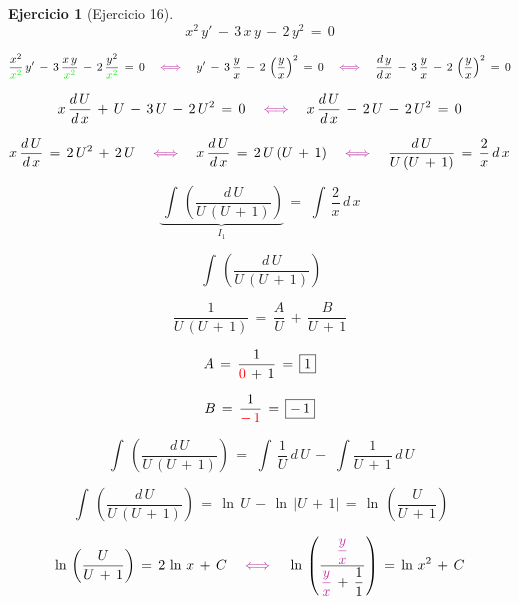 \documentclass[a4paper,11pt,openany]{book}
\newtheorem{ejer}{Ejercicio}[section]
\begin{document}
\begin{ejer}[Ejercicio 16] 

  $$x^{2}\,y'\,-\,3\,x\,y\,-\,2\,y^{2}\,=\,0$$ 


 $$\dfrac{x^{2}}{\textcolor{green}{x^{2}} }\,y'\,-\,3\,\dfrac{x\,y}{\textcolor{green}{x^{2}}}\,-\,2\,\dfrac{y^{2}}{\textcolor{green}{x^{2}}}\,=\,0 \quad \textcolor{byzantine}{\iff} \quad y'\,-\,3\,\dfrac{y}{x}\,-\,2\,\left(\dfrac{y}{x} \right)^{2}\,=\,0 \quad \textcolor{byzantine}{\iff} \quad \dfrac{d\,y}{d\,x}\,-\,3\,\dfrac{y}{x}\,-\,2\,\left(\dfrac{y}{x} \right)^{2}\,=\,0$$ 

 $$x\,\dfrac{d\,U}{d\,x}\,+\,U\,-\,3\,U\,-\,2\,U^{2}\,=\,0 \quad \textcolor{byzantine}{\iff} \quad x\,\dfrac{d\,U}{d\,x}\,-\,2\,U\,-\,2\,U^{2}\,=\,0$$ 

 $$x\,\dfrac{d\,U}{d\,x}\,=\,2\,U^{2}\,+\,2\,U \quad \textcolor{byzantine}{\iff} \quad x\,\dfrac{d\,U}{d\,x}\,=\,2\,U\,(U\,+\,1) \quad \textcolor{byzantine}{\iff} \quad \dfrac{d\,U}{U\,(U\,+\,1)}\,=\,\dfrac{2}{x}\,d\,x$$ 

$$\underbrace{\displaystyle\,\int\,\left(\dfrac{d\,U}{U\,(U\,+\,1)} \right)}_{I_{1}}\,=\,\displaystyle\,\int\,\dfrac{2}{x}\,d\,x$$ 

\begin{tcolorbox}[colback=red!5!white,colframe=red!75!black,fonttitle=\bfseries,title=$I_{1}$]  

$$\displaystyle\,\int\,\left(\dfrac{d\,U}{U\,(U\,+\,1)} \right)$$ 

$$\dfrac{1}{U\,(U\,+\,1)}\,=\,\dfrac{A}{U}\,+\,\dfrac{B}{U\,+\,1}$$ 

$$A\,=\,\dfrac{1}{\textcolor{red}{0}\,+\,1}\,=\,\boxed{1}$$ 

$$B\,=\,\dfrac{1}{\textcolor{red}{-\,1}}\,=\,\boxed{-\,1}$$ 

$$\displaystyle\,\int\,\left(\dfrac{d\,U}{U\,(U\,+\,1)} \right)\,=\,\displaystyle\,\int\,\dfrac{1}{U}\,d\,U\,-\,\displaystyle\,\int\dfrac{1}{U\,+\,1}\,d\,U$$ 

$$\displaystyle\,\int\,\left(\dfrac{d\,U}{U\,(U\,+\,1)} \right)\,=\,\ln\,U\,-\,\ln\,|U\,+\,1|\,=\,\boxed{\ln\,\left(\dfrac{U}{U\,+\,1} \right)}$$ 

\end{tcolorbox}  

 $$\ln\,\left(\dfrac{U}{U\,+\,1} \right)\,=\,2\,\ln\,x\,+\,C \quad \textcolor{byzantine}{\iff} \quad \ln\,\left(\dfrac{\textcolor{byzantine}{\dfrac{y}{x}}}{\textcolor{byzantine}{\dfrac{y}{x}}\,+\,\dfrac{1}{1} } \right)\,=\,\ln\,x^{2}\,+\,C$$ 


\end{ejer}
\end{document}
